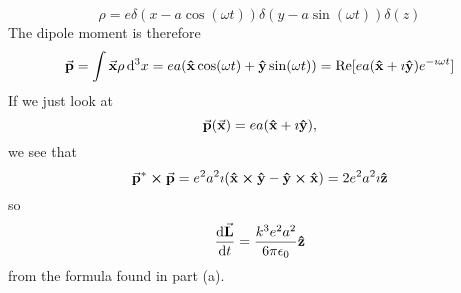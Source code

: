 \documentclass[a4paper,twoside]{article}
\begin{document}
\begin{itemize}
\begin{problem}
            \begin{equation}
                \rho = e \delta(x-a \cos(\omega t)) \delta(y - a \sin(\omega t)) \delta(z)
            \end{equation}
            The dipole moment is therefore
            \begin{equation}
                \va{p} = \int \va{x} \rho \dd[3]{x} = ea ( \vu{x} \cos(\omega t) + \vu{y} \sin(\omega t)) = \Re[ea( \vu{x} + \imath \vu{y}) e^{- \imath \omega t}]
            \end{equation}
            If we just look at
            \begin{equation}
                \va{p}( \va{x}) = ea ( \vu{x} + \imath \vu{y}),
            \end{equation}
            we see that
            \begin{equation}
                \va{p}^* \cross \va{p} = e^2 a^2 \imath( \vu{x} \cross \vu{y} - \vu{y} \cross \vu{x}) = 2 e^2 a^2 \imath \vu{z}
            \end{equation}
            so
            \begin{equation}
                \dv{ \va{L}}{t} = \frac{k^3 e^2 a^2}{6 \pi \epsilon_0} \vu{z}
            \end{equation}
            from the formula found in part (a).
        \end{problem}
\end{itemize}
\end{document}
